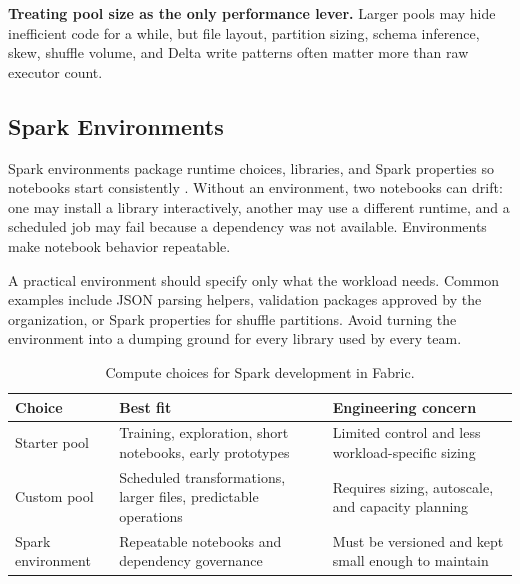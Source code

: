 \begin{pitfall}
\textbf{Treating pool size as the only performance lever.} Larger pools may hide inefficient code for a while, but file layout, partition sizing, schema inference, skew, shuffle volume, and Delta write patterns often matter more than raw executor count.
\end{pitfall}

\subsection{Spark Environments}
Spark environments package runtime choices, libraries, and Spark properties so notebooks start consistently \cite{microsoftFabricSparkEnvironments}. Without an environment, two notebooks can drift: one may install a library interactively, another may use a different runtime, and a scheduled job may fail because a dependency was not available. Environments make notebook behavior repeatable.

A practical environment should specify only what the workload needs. Common examples include JSON parsing helpers, validation packages approved by the organization, or Spark properties for shuffle partitions. Avoid turning the environment into a dumping ground for every library used by every team.

\begin{table}[H]
\centering
\small
\begin{tabular}{@{}p{3.0cm}p{4.6cm}p{4.7cm}@{}}
\toprule
\textbf{Choice} & \textbf{Best fit} & \textbf{Engineering concern} \\
\midrule
Starter pool & Training, exploration, short notebooks, early prototypes & Limited control and less workload-specific sizing \\
Custom pool & Scheduled transformations, larger files, predictable operations & Requires sizing, autoscale, and capacity planning \\
Spark environment & Repeatable notebooks and dependency governance & Must be versioned and kept small enough to maintain \\
\bottomrule
\end{tabular}
\caption{Compute choices for Spark development in Fabric.}
\label{tab:chapter3-compute-choices}
\end{table}

